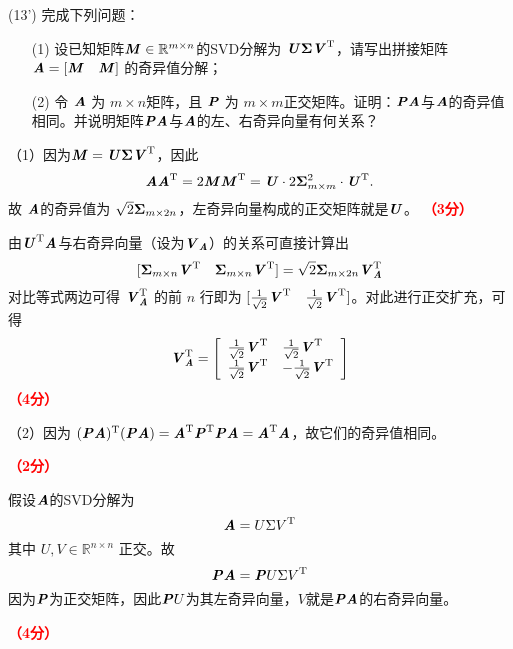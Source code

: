 \documentclass[12pt,a4paper,openany,twoside]{ctexbook}
\begin{document}
\begin{exercise}(13')
	完成下列问题：
 \begin{itemize}
 	\item [(1)] 设已知矩阵$ \MM \in \mathbb{R}^{m \times n} $的SVD分解为 $\MU \MSigma \MV\T$，请写出拼接矩阵 $\MA = [\MM \quad \MM]$ 的奇异值分解；
 	\item [(2)] 令 $\MA$ 为 $m\times n$矩阵，且 $\MP$ 为 $m\times m$正交矩阵。证明：$\MP \MA$与$\MA$的奇异值相同。并说明矩阵$\MP \MA$与$\MA$的左、右奇异向量有何关系？
 \end{itemize}
\end{exercise}
\begin{Solution}
	（1）因为$\MM=\MU \MSigma \MV\T$，因此
		\[
		\MA \MA\T = 2 \MM \MM\T = \MU \cdot 2\MSigma_{m \times m}^2 \cdot \MU\T.
		\]
		故
		$\MA$的奇异值为 $\sqrt{2}\MSigma_{m \times 2n}$，左奇异向量构成的正交矩阵就是$\MU$。
		\hfill \textcolor{red}{\textbf{（3分）}}
		
		由$\MU\T \MA$与右奇异向量（设为$\MV_{\MA}$）的关系可直接计算出
		$$[\MSigma_{m \times n}\MV\T \quad \MSigma_{m \times n}\MV\T] = \sqrt{2} \MSigma_{m \times 2n} \MV_{\MA}\T$$
		对比等式两边可得 $\MV_{\MA}\T$ 的前 $n$ 行即为 $[\frac{1}{\sqrt{2}}\MV\T \quad \frac{1}{\sqrt{2}}\MV\T]$。对此进行正交扩充，可得
		$$
		\MV_{\MA}\T = 
		\left[\begin{array}{ll}
			\frac{1}{\sqrt{2}}\MV\T & \frac{1}{\sqrt{2}}\MV\T \\
			\frac{1}{\sqrt{2}}\MV\T & -\frac{1}{\sqrt{2}}\MV\T
		\end{array}\right]
		$$
\hfill \textcolor{red}{\textbf{（4分）}}

	（2）因为 $(\MP\MA)\T (\MP\MA) = \MA\T\MP\T\MP\MA=\MA\T\MA$，故它们的奇异值相同。
	
	\hfill \textcolor{red}{\textbf{（2分）}}
	
	假设$\MA$的SVD分解为
	$$
	\MA=U \Sigma V^{\mathrm{T}}
	$$
	其中 $U, V \in \mathbb{R}^{n \times n}$ 正交。故
	$$
	\MP\MA=\MP U \Sigma V^{\mathrm{T}}
	$$
	因为$\MP$为正交矩阵，因此$\MP U$为其左奇异向量，$V$就是$\MP \MA$的右奇异向量。
	
	\hfill \textcolor{red}{\textbf{（4分）}}	
	
\end{Solution}
\end{document}

